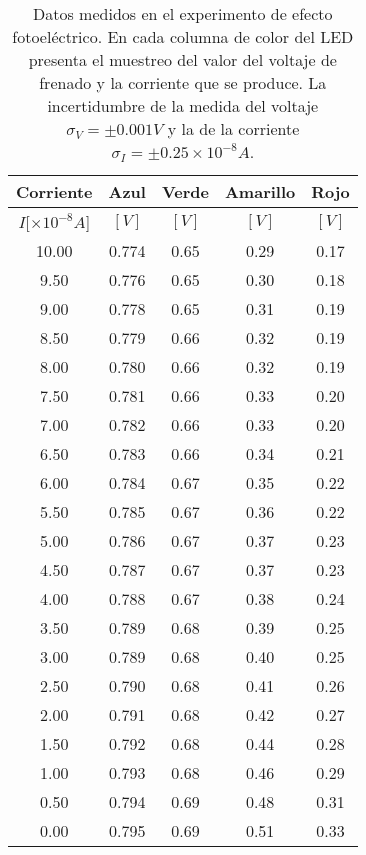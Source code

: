 \begin{table}[H]
    \centering
    \resizebox{8cm}{!} {
    \begin{ruledtabular}
    \begin{tabular}{ccccc}
    \hline
        Corriente & Azul  & Verde & Amarillo & Rojo \\ 
        \hline
        $I [ 	\times 10^{-8} A$] & $[V]$ &  $[V]$ &  $[V]$ &  $[V]$ \\ 
        \hline
        10.00  &0.774 & 0.65 & 0.29 & 0.17 \\ 
        9.50 & 0.776 & 0.65 & 0.30 & 0.18 \\ 
        9.00 & 0.778 & 0.65 & 0.31 & 0.19 \\ 
        8.50 & 0.779 & 0.66 & 0.32 & 0.19 \\ 
        8.00 & 0.780 & 0.66 & 0.32 & 0.19 \\ 
        7.50 & 0.781 & 0.66 & 0.33 & 0.20 \\ 
        7.00 & 0.782 & 0.66 & 0.33 & 0.20 \\ 
        6.50 & 0.783 & 0.66 & 0.34 & 0.21 \\ 
        6.00 & 0.784 & 0.67 & 0.35 & 0.22 \\ 
        5.50 & 0.785 & 0.67 & 0.36 & 0.22 \\ 
        5.00 & 0.786 & 0.67 & 0.37 & 0.23 \\ 
        4.50 & 0.787 & 0.67 & 0.37 & 0.23 \\ 
        4.00 & 0.788 & 0.67 & 0.38 & 0.24 \\ 
        3.50 & 0.789 & 0.68 & 0.39 & 0.25 \\ 
        3.00 & 0.789 & 0.68 & 0.40 & 0.25 \\ 
        2.50 & 0.790 & 0.68 & 0.41 & 0.26 \\ 
        2.00 & 0.791 & 0.68 & 0.42 & 0.27 \\ 
        1.50 & 0.792 & 0.68 & 0.44 & 0.28 \\ 
        1.00 & 0.793 & 0.68 & 0.46 & 0.29 \\ 
        0.50 & 0.794 & 0.69 & 0.48 & 0.31 \\ 
        0.00 & 0.795 & 0.69 & 0.51 & 0.33 \\ 
    \end{tabular}
    \end{ruledtabular}
    }
    \caption{Datos medidos en el experimento de efecto fotoeléctrico. En cada columna de color del LED presenta el muestreo del  valor del voltaje de frenado y la corriente que se produce. La incertidumbre de la medida del voltaje $\sigma_{V} = \pm 0.001 V$ y la de la corriente $\sigma_{I} = \pm 0.25\times 10^{-8} A$. }
    \label{table:tabla_datos}
\end{table}